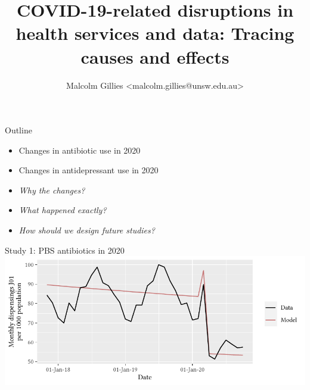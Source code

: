 \documentclass[aspectratio=169,12pt]{beamer} %
\title{COVID-19-related disruptions in health services and data: Tracing causes and effects}
\author{Malcolm Gillies <malcolm.gillies@unsw.edu.au>}
\institute{27 April 2023}
\begin{document}

{
  \begin{frame}[plain]
    \titlepage
  \end{frame}
}

\begin{frame}{Outline}
	\begin{itemize}
		\item Changes in antibiotic use in 2020
		\item Changes in antidepressant use in 2020
		\item \emph{Why the changes?}
		\item \emph{What happened exactly?}
		\item \emph{How should we design future studies?}
	\end{itemize}
\end{frame}

\begin{frame}{Study 1: PBS antibiotics in 2020}
\centering
\includegraphics{ref/latex-j01armap3-1.pdf}
\end{frame}
\end{document}
